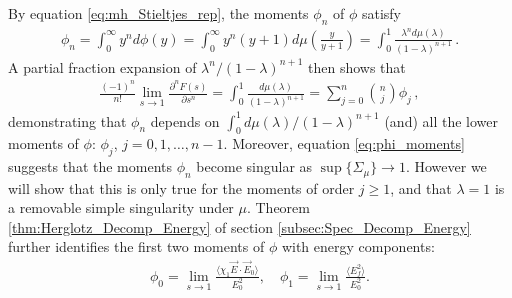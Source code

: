 \documentclass[english,12pt,jmp,graphicx]{revtex4-1}
\begin{document}
By equation \eqref{eq:mh_Stieltjes_rep}, the moments $\phi_n$ of $\phi$
satisfy  
%
\begin{align}\label{eq:phi_moments}
  \phi_n=\int_0^\infty y^nd\phi(y)
    =\int_0^\infty y^n(y+1)d\mu\left(\frac{y}{y+1}\right)
    =\int_0^1\frac{\lambda^nd\mu(\lambda)}{(1-\lambda)^{n+1}}\,.
\end{align}
%
A partial fraction expansion of $\lambda^n/(1-\lambda)^{n+1}$ then shows that
%
\begin{align}\label{eq:phi_moments_F(s)}
  \frac{(-1)^n}{n!}\lim_{s\to1}\frac{\partial^nF(s)}{\partial s^n}=\int_0^1\frac{d\mu(\lambda)}{(1-\lambda)^{n+1}}
                                =\sum_{j=0}^n{n \choose j} \phi_j\,,
\end{align}
%
demonstrating that $\phi_n$ depends on $\int_0^1d\mu(\lambda)/(1-\lambda)^{n+1}$
(and) all the lower moments of $\phi$: $\phi_j$, $j=0,1,\ldots,n-1$. Moreover,
equation \eqref{eq:phi_moments} suggests that the moments $\phi_n$ become
singular as $\sup\{\Sigma_\mu\}\to1$. However
we will show that this is only true for the moments of order $j\geq1$,
and that $\lambda=1$ is a removable simple singularity under $\mu$. Theorem
\ref{thm:Herglotz_Decomp_Energy} of section
\ref{subsec:Spec_Decomp_Energy} further identifies the first two
moments of $\phi$ with energy components: 
%
\begin{align}\label{eq:phi_energy_relations}
  \phi_0=\lim_{s\to1}\frac{\langle\chi_1\vec{E}\cdot\vec{E}_0\rangle}{E_0^2},   \quad
  \phi_1=\lim_{s\to1}\frac{\langle E_f^2\rangle}{E_0^2}.
\end{align}
%
\end{document}
